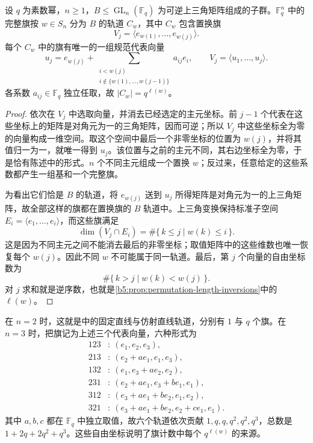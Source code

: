 \begin{proposition}\label{b5:prop:flag-permutation-coordinates}
	设 \(q\) 为素数幂，\(n\ge1\)，\(B\le\operatorname{GL}_n(\mathbb F_q)\) 为可逆上三角矩阵组成的子群。\(\mathbb F_q^n\) 中的完整旗按 \(w\in S_n\) 分为 \(B\) 的轨道 \(C_w\)，其中 \(C_w\) 包含置换旗
	\[
		V_j=\langle e_{w(1)},\ldots,e_{w(j)}\rangle.
	\]
	每个 \(C_w\) 中的旗有唯一的一组规范代表向量
	\[
		u_j=e_{w(j)}+ \sum_{\substack{i<w(j)\\ i\notin\{w(1),\ldots,w(j-1)\}}} a_{ij}e_i, \qquad V_j=\langle u_1,\ldots,u_j\rangle.
	\]
	各系数 \(a_{ij}\in\mathbb F_q\) 独立任取，故 \(|C_w|=q^{\ell(w)}\)。
\end{proposition}
\begin{proof}
	依次在 \(V_j\) 中选取向量，并消去已经选定的主元坐标。前 \(j-1\) 个代表在这些坐标上的矩阵是对角元为一的三角矩阵，因而可逆；所以 \(V_j\) 中这些坐标全为零的向量构成一维空间。取这个空间中最后一个非零坐标的位置为 \(w(j)\)，并将其值归一为一，就唯一得到 \(u_j\)。该位置与之前的主元不同，其右边坐标全为零，于是恰有陈述中的形式。\(n\) 个不同主元组成一个置换 \(w\)；反过来，任意给定的这些系数都产生一组基和一个完整旗。

	为看出它们恰是 \(B\) 的轨道，将 \(e_{w(j)}\) 送到 \(u_j\) 所得矩阵是对角元为一的上三角矩阵，故全部这样的旗都在置换旗的 \(B\) 轨道中。上三角变换保持标准子空间 \(E_i=\langle e_1,\ldots,e_i\rangle\)，而这些旗满足
	\[
		\dim(V_j\cap E_i)=\#\{\,k\le j\mid w(k)\le i\,\}.
	\]
	这是因为不同主元之间不能消去最后的非零坐标；取值矩阵中的这些维数也唯一恢复每个 \(w(j)\)。因此不同 \(w\) 不可能属于同一轨道。最后，第 \(j\) 个向量的自由坐标数为
	\[
		\#\{\,k>j\mid w(k)<w(j)\,\}.
	\]
	对 \(j\) 求和就是逆序数，也就是\cref{b5:prop:permutation-length-inversions}中的 \(\ell(w)\)。
\end{proof}

在 \(n=2\) 时，这就是中的固定直线与仿射直线轨道，分别有 \(1\) 与 \(q\) 个旗。在 \(n=3\) 时，把旗记为上述三个代表向量，六种形式为
\[
	\begin{aligned}
		123&:\ (e_1,e_2,e_3),\\
		213&:\ (e_2+a e_1,e_1,e_3),\\
		132&:\ (e_1,e_3+a e_2,e_2),\\
		231&:\ (e_2+a e_1,e_3+b e_1,e_1),\\
		312&:\ (e_3+a e_1+b e_2,e_1,e_2),\\
		321&:\ (e_3+a e_1+b e_2,e_2+c e_1,e_1).
	\end{aligned}
\]
其中 \(a,b,c\) 都在 \(\mathbb F_q\) 中独立取值，故六个轨道依次贡献 \(1,q,q,q^2,q^2,q^3\)，总数是 \(1+2q+2q^2+q^3\)。这些自由坐标说明了旗计数中每个 \(q^{\ell(w)}\) 的来源。

